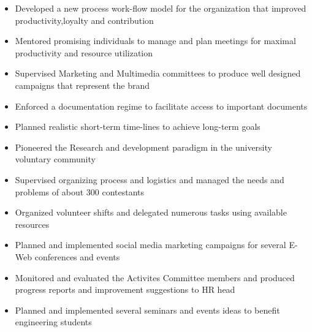 \documentclass[10pt,a4paper]{altacv}
\begin{document}
\begin{itemize}
\item Developed a new process work-flow model for the organization that improved productivity,loyalty and contribution
\item Mentored promising individuals to manage and plan meetings for maximal productivity and resource utilization
\item Supervised Marketing and Multimedia committees to produce well designed campaigns that represent the brand
\item Enforced a documentation regime to facilitate access to important documents
\item Planned realistic short-term time-lines to achieve long-term goals
\item Pioneered the Research and development paradigm in the university voluntary community
\end{itemize}

\divider
{}
\begin{itemize}
\item Supervised organizing process and logistics and managed the needs and problems of  about 300 contestants
\item Organized volunteer shifts and delegated numerous tasks using available resources
\end{itemize}

\divider



\begin{itemize}
\item Planned and implemented social media marketing campaigns for several E-Web conferences and events
\item Monitored and evaluated the Activites Committee members and produced progress reports and improvement suggestions to HR head
\item Planned and implemented several seminars and events ideas to benefit engineering students
\end{itemize}










\clearpage
\end{document}
